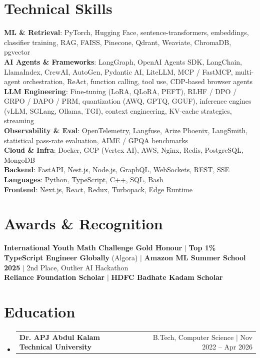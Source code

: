 \documentclass[letterpaper,10pt]{article}
\makeatletter
\newcommand{\resumeProjectHeading}[2]{
    \item
    \begin{tabular*}{0.97\textwidth}{l@{\extracolsep{\fill}}r}
      \small#1 & #2 \\
    \end{tabular*}\vspace{-7pt}
}
\newcommand{\resumeSubHeadingListStart}{\begin{itemize}[leftmargin=0.15in, label={}]}
\newcommand{\resumeSubHeadingListEnd}{\end{itemize}}
\makeatother
\begin{document}
\section{Technical Skills}
 \begin{itemize}[leftmargin=0.15in, label={}]
    \small{\item{
     \textbf{ML \& Retrieval}{: PyTorch, Hugging Face, sentence-transformers, embeddings, classifier training, RAG, FAISS, Pinecone, Qdrant, Weaviate, ChromaDB, pgvector} \\
     \textbf{AI Agents \& Frameworks}{: LangGraph, OpenAI Agents SDK, LangChain, LlamaIndex, CrewAI, AutoGen, Pydantic AI, LiteLLM, MCP / FastMCP, multi-agent orchestration, ReAct, function calling, tool use, CDP-based browser agents} \\
     \textbf{LLM Engineering}{: Fine-tuning (LoRA, QLoRA, PEFT), RLHF / DPO / GRPO / DAPO / PRM, quantization (AWQ, GPTQ, GGUF), inference engines (vLLM, SGLang, Ollama, TGI), context engineering, KV-cache strategies, streaming} \\
     \textbf{Observability \& Eval}{: OpenTelemetry, Langfuse, Arize Phoenix, LangSmith, statistical pass-rate evaluation, AIME / GPQA benchmarks} \\
     \textbf{Cloud \& Infra}{: Docker, GCP (Vertex AI), AWS, Nginx, Redis, PostgreSQL, MongoDB} \\
     \textbf{Backend}{: FastAPI, Nest.js, Node.js, GraphQL, WebSockets, REST, SSE} \\
     \textbf{Languages}{: Python, TypeScript, C++, SQL, Bash} \\
     \textbf{Frontend}{: Next.js, React, Redux, Turbopack, Edge Runtime} \\
    }}
 \end{itemize}

\section{Awards \& Recognition}
 \begin{itemize}[leftmargin=0.15in, label={}]
    \small{\item{
     \textbf{International Youth Math Challenge Gold Honour} $|$
     \textbf{Top 1\% TypeScript Engineer Globally} (Algora) $|$
     \textbf{Amazon ML Summer School 2025} $|$
     2nd Place, Outlier AI Hackathon
     \\[2pt]
     \textbf{Reliance Foundation Scholar} $|$
     \textbf{HDFC Badhate Kadam Scholar}
    }}
 \end{itemize}

\section{Education}
  \resumeSubHeadingListStart
    \resumeProjectHeading
      {\textbf{Dr. APJ Abdul Kalam Technical University}}{B.Tech, Computer Science $|$ Nov 2022 -- Apr 2026}
  \resumeSubHeadingListEnd
\end{document}

